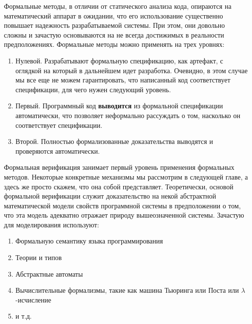 Формальные методы, в отличии от статического анализа кода, опираются на математический аппарат в ожидании, что его использование существенно повышает надежность разрабатываемой системы. При этом, они довольно сложны и зачастую основываются на не всегда достижимых в реальности предположениях. Формальные методы можно применять на трех уровнях:

\begin{enumerate}
  \item Нулевой. Разрабатывают формальную спецификацию, как артефакт, с оглядкой на который в дальнейшем идет разработка. Очевидно, в этом случае мы все еще не можем гарантировать, что написанный код соответствует спецификации, для чего нужен следующий уровень.
  \item Первый. Программный код \textbf{выводится} из формальной спецификации автоматически, что позволяет неформально рассуждать о том, насколько он соответствует спецификации.
  \item Второй. Полностью формализованные доказательства выводятся и проверяются автоматически.
\end{enumerate}

Формальная верификация занимает первый уровень применения формальных методов. Некоторые конкретные механизмы мы рассмотрим в следующей главе, а здесь же просто скажем, что она собой представляет. Теоретически, основой формальной верификации служит доказательство на некой абстрактной математической модели свойств программной системы в предположении о том, что эта модель адекватно отражает природу вышеозначенной системы. Зачастую для моделирования используют:

\begin{enumerate}
  \item Формальную семантику языка программирования
  \item Теории и типов
  \item Абстрактные автоматы
  \item Вычислительные формализмы, такие как машина Тьюринга или Поста или $\lambda$-исчисление
  \item и т.д.
\end{enumerate}
